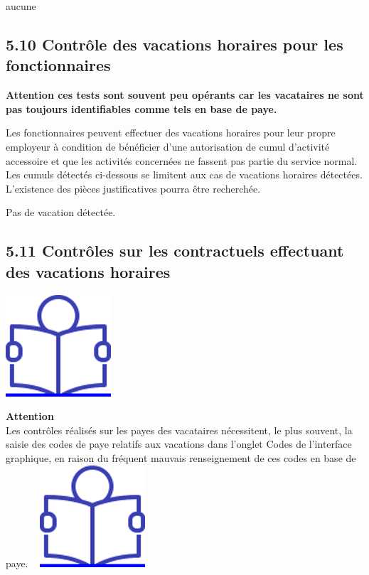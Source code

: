 aucune

\hypertarget{controle-des-vacations-horaires-pour-les-fonctionnaires}{%
\subsection{5.10 Contrôle des vacations horaires pour les
fonctionnaires}\label{controle-des-vacations-horaires-pour-les-fonctionnaires}}

\textbf{Attention ces tests sont souvent peu opérants car les vacataires
ne sont pas toujours identifiables comme tels en base de paye.}

Les fonctionnaires peuvent effectuer des vacations horaires pour leur
propre employeur à condition de bénéficier d'une autorisation de cumul
d'activité accessoire et que les activités concernées ne fassent pas
partie du service normal. Les cumuls détectés ci-dessous se limitent aux
cas de vacations horaires détectées. L'existence des pièces
justificatives pourra être recherchée.

Pas de vacation détectée.

\hypertarget{controles-sur-les-contractuels-effectuant-des-vacations-horaires}{%
\subsection{5.11 Contrôles sur les contractuels effectuant des vacations
horaires}\label{controles-sur-les-contractuels-effectuant-des-vacations-horaires}}

\href{../Docs/Notices/fiche_CEV_droit.odt}{\includegraphics{icones/Notice.png}}

\textbf{Attention}\\
Les contrôles réalisés sur les payes des vacataires nécessitent, le plus
souvent, la saisie des codes de paye relatifs aux vacations dans
l'onglet Codes de l'interface graphique, en raison du fréquent mauvais
renseignement de ces codes en base de paye. ~
\href{../Docs/Notices/fiche_onglet_codes.odt}{\includegraphics{icones/Notice.png}}

